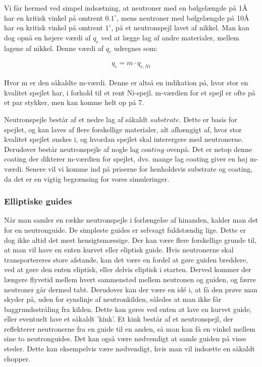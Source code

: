 \documentclass[12pt,oneside,a4paper]{article}
\begin{document}
{{{{{Vi får hermed ved simpel indsætning, at neutroner med en bølgelængde på 1Å har en kritisk vinkel på omtrent $0.1^∘$, mens neutroner med bølgelængde på 10Å har en kritisk vinkel på omtrent $1^∘$, på et neutronspejl lavet af nikkel.
Man kan dog opnå en højere værdi af $q_c$ ved at lægge lag af andre materialer, mellem lagene af nikkel. Denne værdi af $q_c$ udregnes som:

\begin{align}
q_c=m \cdot q_{c,Ni}
\end{align}

Hvor m er den såkaldte m-værdi. Denne er altså en indikation på, hvor stor en kvalitet spejlet har, i forhold til et rent Ni-spejl. m-værdien for et spejl er ofte på et par stykker, men kan komme helt op på 7. \cite{lefmann_arleth_kirkensgaard_lebech_thomsen}

Neutronspejle består af et nedre lag af såkaldt $substrate$. Dette er basis for spejlet, og kan laves af flere forskellige materialer, alt afhængigt af, hvor stor kvalitet spejlet ønskes i, og hvordan spejlet skal interergere med neutronerne. Derudover består neutronspejle af nogle lag $coating$ ovenpå. Det er netop denne coating der dikterer m-værdien for spejlet, dvs. mange lag coating giver en høj m-værdi. Senere vil vi komme ind på priserne for henholdsvis substrate og coating, da det er en vigtig begrænsing for vores simuleringer.

\subsubsection{Elliptiske guides}
Når man samler en række neutronspejle i forlængelse af hinanden, kalder man det for en neutronguide. De simpleste guides er selvsagt fuldstændig lige. Dette er dog ikke altid det mest hensigtsmæssige. Der kan være flere forskellige grunde til, at man vil have en enten kurvet eller eliptisk guide. Hvis neutronerne skal transportereres store afstande, kan det være en fordel at gøre guiden breddere, ved at gøre den enten eliptisk, eller delvis eliptisk i starten. Derved kommer der længere flyvetid mellem hvert sammenstød mellem neutronen og guiden, og færre neutroner går dermed tabt. Derudover kan der være en idé i, at få den prøve man skyder på, uden for synslinje af neutronkilden, således at man ikke får baggrundsstråling fra kilden. Dette kan gøres ved enten at lave en kurvet guide, eller eventuelt lave et såkaldt 'kink'. Et kink består af et neutronspejl, der reflekterer neutronerne fra en guide til en anden, så man kan få en vinkel mellem sine to neutronguides. 
Det kan også være nødvendigt at samle guiden på visse steder. Dette kan eksempelvis være nødvendigt, hvis man vil indsætte en såkaldt chopper.

}}}}}
\end{document}
